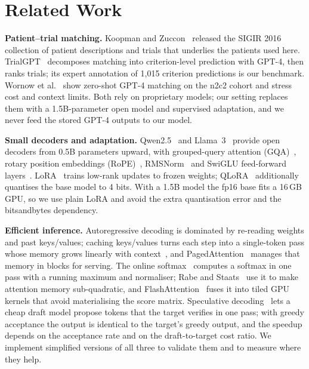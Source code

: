 \documentclass[conference]{IEEEtran}
\begin{document}
\section{Related Work}
\textbf{Patient--trial matching.} Koopman and Zuccon~\cite{koopman2016test} released the SIGIR 2016 collection of patient descriptions and trials that underlies the patients used here. TrialGPT~\cite{jin2024trialgpt} decomposes matching into criterion-level prediction with GPT-4, then ranks trials; its expert annotation of 1{,}015 criterion predictions is our benchmark. Wornow et al.~\cite{wornow2024zeroshot} show zero-shot GPT-4 matching on the n2c2 cohort and stress cost and context limits. Both rely on proprietary models; our setting replaces them with a 1.5B-parameter open model and supervised adaptation, and we never feed the stored GPT-4 outputs to our model.

\textbf{Small decoders and adaptation.} Qwen2.5~\cite{qwen2025qwen25} and Llama~3~\cite{dubey2024llama3} provide open decoders from 0.5B parameters upward, with grouped-query attention (GQA)~\cite{ainslie2023gqa}, rotary position embeddings (RoPE)~\cite{su2024roformer}, RMSNorm~\cite{zhang2019rmsnorm} and SwiGLU feed-forward layers~\cite{shazeer2020glu}. LoRA~\cite{hu2022lora} trains low-rank updates to frozen weights; QLoRA~\cite{dettmers2023qlora} additionally quantises the base model to 4 bits. With a 1.5B model the fp16 base fits a 16\,GB GPU, so we use plain LoRA and avoid the extra quantisation error and the bitsandbytes dependency.

\textbf{Efficient inference.} Autoregressive decoding is dominated by re-reading weights and past keys/values; caching keys/values turns each step into a single-token pass whose memory grows linearly with context~\cite{pope2023efficiently}, and PagedAttention~\cite{kwon2023pagedattention} manages that memory in blocks for serving. The online softmax~\cite{milakov2018online} computes a softmax in one pass with a running maximum and normaliser; Rabe and Staats~\cite{rabe2021selfattention} use it to make attention memory sub-quadratic, and FlashAttention~\cite{dao2022flashattention,dao2024flashattention2} fuses it into tiled GPU kernels that avoid materialising the score matrix. Speculative decoding~\cite{leviathan2023fast,chen2023accelerating} lets a cheap draft model propose tokens that the target verifies in one pass; with greedy acceptance the output is identical to the target's greedy output, and the speedup depends on the acceptance rate and on the draft-to-target cost ratio. We implement simplified versions of all three to validate them and to measure where they help.
\end{document}
